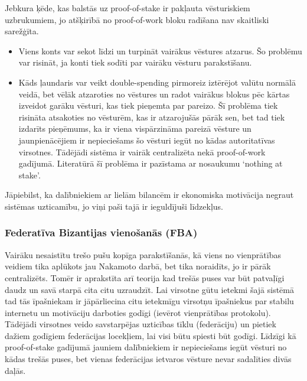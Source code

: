 Jebkura ķēde, kas balstās uz proof-of-stake ir pakļauta vēsturiskiem uzbrukumiem, jo atšķirībā no proof-of-work bloku radīšana nav skaitliski sarežģīta.
\begin{itemize}
    \item Viens konts var sekot līdzi un turpināt vairākus vēstures atzarus. Šo problēmu var risināt, ja konti tiek sodīti par vairāku vēsturu parakstīšanu.
    \item Kāds ļaundaris var veikt double-spending pirmoreiz iztērējot valūtu normālā veidā, bet vēlāk atzaroties no vēstures un radot vairākus blokus pēc kārtas izveidot garāku vēsturi, kas tiek pieņemta par pareizo. Šī problēma tiek risināta atsakoties no vēsturēm, kas ir atzarojušās pārāk sen, bet tad tiek izdarīts pieņēmums, ka ir viena vispārzināma pareizā vēsture un jaunpienācējiem ir nepieciešams šo vēsturi iegūt no kādas autoritatīvas virsotnes. Tādējādi sistēma ir vairāk centralizēta nekā proof-of-work gadījumā.\cite{poelstra15} Literatūrā šī problēma ir pazīstama ar nosaukumu `nothing at stake'.
\end{itemize}
Jāpiebilst, ka dalībniekiem ar lielām bilancēm ir ekonomiska motivācija negraut sistēmas uzticamību, jo viņi paši tajā ir ieguldījuši līdzekļus.

\subsubsection{Federatīva Bizantijas vienošanās (FBA)}
Vairāku nesaistītu trešo pušu kopīga parakstīšanās, kā viens no vienprātības veidiem tika aplūkots jau Nakamoto darbā\cite{nakamoto08}, bet tika noraidīts, jo ir pārāk centralizēts. Tomēr ir aprakstīta arī teorija kad trešās puses var būt patvaļīgi daudz un savā starpā cita citu uzraudzīt.\cite{mazieres15}
Lai virsotne gūtu ietekmi šajā sistēmā tad tās īpašniekam ir jāpārliecina citu ietekmīgu virsotņu īpašniekus par stabilu internetu un motivāciju darboties godīgi (ievērot vienprātības protokolu). Tādējādi virsotnes veido savstarpējas uzticības tīklu (federāciju) un pietiek dažiem godīgiem federācijas locekļiem, lai visi būtu spiesti būt godīgi. Līdzīgi kā proof-of-stake gadījumā jauniem dalībniekiem ir nepieciešams iegūt vēsturi no kādas trešās puses, bet vienas federācijas ietvaros vēsture nevar sadalīties divās daļās.

